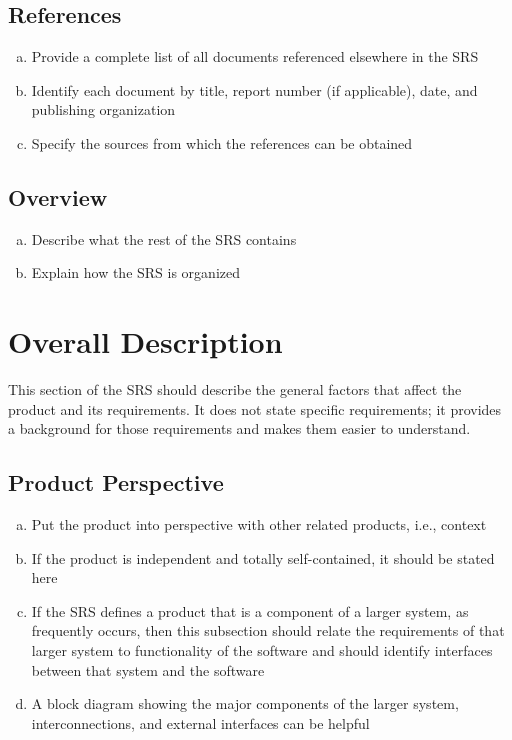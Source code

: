 \documentclass[titlepage]{article}
\begin{document}
\subsection{References}
\label{sub:references}
\begin{enumerate}[a)]
	\item Provide a complete list of all documents referenced elsewhere in the SRS
	\item Identify each document by title, report number (if applicable), date, and publishing organization
	\item Specify the sources from which the references can be obtained
\end{enumerate}

\subsection{Overview}
\label{sub:overview}
\begin{enumerate}[a)]
	\item Describe what the rest of the SRS contains
	\item Explain how the SRS is organized
\end{enumerate}


\section{Overall Description}
\label{sec:overall_description}

This section of the SRS should describe the general factors that affect the product and its requirements. It does not state specific requirements; it provides a background for those requirements and makes them easier to understand.

\subsection{Product Perspective}
\label{sub:product_perspective}
\begin{enumerate}[a)]
	\item Put the product into perspective with other related products, i.e., context
	\item If the product is independent and totally self-contained, it should be stated here
	\item If the SRS defines a product that is a component of a larger system, as frequently occurs, then this subsection should relate the requirements of that larger system to functionality of the software and should identify interfaces between that system and the software
	\item A block diagram showing the major components of the larger system, interconnections, and external interfaces can be helpful
\end{enumerate}
\end{document}
